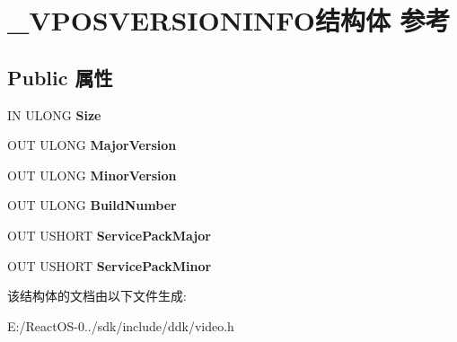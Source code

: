 \hypertarget{struct___v_p_o_s_v_e_r_s_i_o_n_i_n_f_o}{}\section{\+\_\+\+V\+P\+O\+S\+V\+E\+R\+S\+I\+O\+N\+I\+N\+F\+O结构体 参考}
\label{struct___v_p_o_s_v_e_r_s_i_o_n_i_n_f_o}
\subsection*{Public 属性}
\begin{DoxyCompactItemize}
\item 
\mbox{\label{struct___v_p_o_s_v_e_r_s_i_o_n_i_n_f_o_ada6280c3afe16a43a24e66fec0a71f3a}} 
IN U\+L\+O\+NG {\bfseries Size}
\item 
\mbox{\label{struct___v_p_o_s_v_e_r_s_i_o_n_i_n_f_o_ab19756ec1b31ed95b333380e7f6df31d}} 
O\+UT U\+L\+O\+NG {\bfseries Major\+Version}
\item 
\mbox{\label{struct___v_p_o_s_v_e_r_s_i_o_n_i_n_f_o_a174081c5784e07107b6cb8d3c583e1f8}} 
O\+UT U\+L\+O\+NG {\bfseries Minor\+Version}
\item 
\mbox{\label{struct___v_p_o_s_v_e_r_s_i_o_n_i_n_f_o_ab0e273338122a64ff92de6db4ad6c790}} 
O\+UT U\+L\+O\+NG {\bfseries Build\+Number}
\item 
\mbox{\label{struct___v_p_o_s_v_e_r_s_i_o_n_i_n_f_o_af28aa92ea366660c7f87573ed0fdb9a5}} 
O\+UT U\+S\+H\+O\+RT {\bfseries Service\+Pack\+Major}
\item 
\mbox{\label{struct___v_p_o_s_v_e_r_s_i_o_n_i_n_f_o_a235cedc471393c0de2687e35390ae272}} 
O\+UT U\+S\+H\+O\+RT {\bfseries Service\+Pack\+Minor}
\end{DoxyCompactItemize}


该结构体的文档由以下文件生成\+:\begin{DoxyCompactItemize}
\item 
E\+:/\+React\+O\+S-\/0../sdk/include/ddk/video.\+h\end{DoxyCompactItemize}
